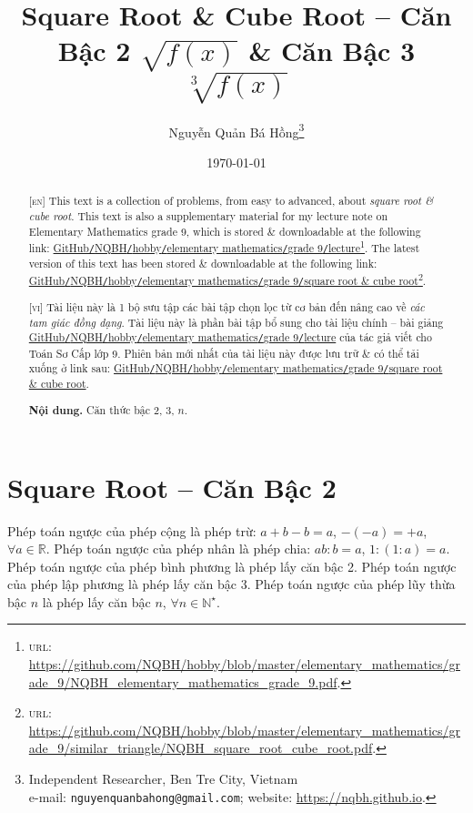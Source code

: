 \documentclass{article}
\title{Square Root \& Cube Root -- Căn Bậc 2 $\sqrt{f(x)}$ \& Căn Bậc 3 $\sqrt[3]{f(x)}$}
\author{Nguyễn Quản Bá Hồng\footnote{Independent Researcher, Ben Tre City, Vietnam\\e-mail: \texttt{nguyenquanbahong@gmail.com}; website: \url{https://nqbh.github.io}.}}
\date{\today}
\begin{document}
\maketitle
\begin{abstract}
	\textsc{[en]} This text is a collection of problems, from easy to advanced, about \textit{square root \& cube root}. This text is also a supplementary material for my lecture note on Elementary Mathematics grade 9, which is stored \& downloadable at the following link: \href{https://github.com/NQBH/hobby/blob/master/elementary_mathematics/grade_9/NQBH_elementary_mathematics_grade_9.pdf}{GitHub\texttt{/}NQBH\texttt{/}hobby\texttt{/}elementary mathematics\texttt{/}grade 9\texttt{/}lecture}\footnote{\textsc{url}: \url{https://github.com/NQBH/hobby/blob/master/elementary_mathematics/grade_9/NQBH_elementary_mathematics_grade_9.pdf}.}. The latest version of this text has been stored \& downloadable at the following link: \href{https://github.com/NQBH/hobby/blob/master/elementary_mathematics/grade_9/square_root_cube_root/NQBH_square_root_cube_root.pdf}{GitHub\texttt{/}NQBH\texttt{/}hobby\texttt{/}elementary mathematics\texttt{/}grade 9\texttt{/}square root \& cube root}\footnote{\textsc{url}: \url{https://github.com/NQBH/hobby/blob/master/elementary_mathematics/grade_9/similar_triangle/NQBH_square_root_cube_root.pdf}.}.
	\vspace{2mm}
	
	\textsc{[vi]} Tài liệu này là 1 bộ sưu tập các bài tập chọn lọc từ cơ bản đến nâng cao về \textit{các tam giác đồng dạng}. Tài liệu này là phần bài tập bổ sung cho tài liệu chính -- bài giảng \href{https://github.com/NQBH/hobby/blob/master/elementary_mathematics/grade_9/NQBH_elementary_mathematics_grade_9.pdf}{GitHub\texttt{/}NQBH\texttt{/}hobby\texttt{/}elementary mathematics\texttt{/}grade 9\texttt{/}lecture} của tác giả viết cho Toán Sơ Cấp lớp 9. Phiên bản mới nhất của tài liệu này được lưu trữ \& có thể tải xuống ở link sau: \href{https://github.com/NQBH/hobby/blob/master/elementary_mathematics/grade_9/square_root_cube_root/NQBH_square_root_cube_root.pdf}{GitHub\texttt{/}NQBH\texttt{/}hobby\texttt{/}elementary mathematics\texttt{/}grade 9\texttt{/}square root \& cube root}.
	
	\textsf{\textbf{Nội dung.} Căn thức bậc 2, 3, $n$.}
\end{abstract}
\tableofcontents
\newpage


\section{Square Root -- Căn Bậc 2}
Phép toán ngược của phép cộng là phép trừ: $a + b - b = a$, $-(-a) = +a$, $\forall a\in\mathbb{R}$. Phép toán ngược của phép nhân là phép chia: $ab:b = a$, $1:(1:a) = a$. Phép toán ngược của phép bình phương là phép lấy căn bậc 2. Phép toán ngược của phép lập phương là phép lấy căn bậc 3. Phép toán ngược của phép lũy thừa bậc $n$ là phép lấy căn bậc $n$, $\forall n\in\mathbb{N}^\star$.
\end{document}
